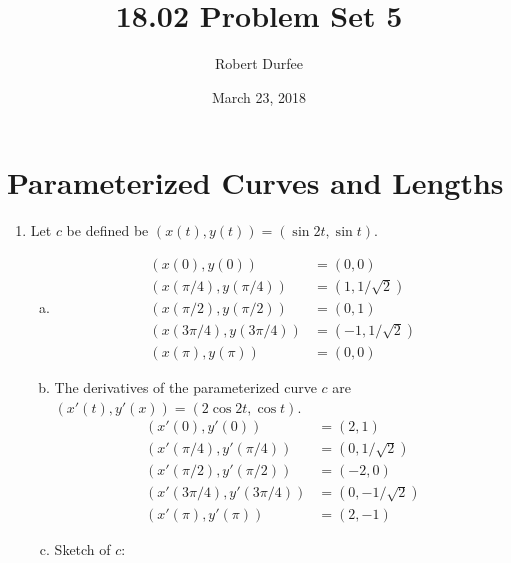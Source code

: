 \documentclass{article}
\title{ 18.02 Problem Set 5 }
\author{ Robert Durfee }
\date{ March 23, 2018 }
\begin{document}
\maketitle

\section{ Parameterized Curves and Lengths }

\begin{enumerate}[1.]
  \item Let $c$ be defined be $(x(t),y(t)) = (\sin 2t, \sin t)$.
    \begin{enumerate}[a.]
      \item \begin{align*}
          (x(0),y(0)) &= (0,0) \\
          (x(\pi / 4), y(\pi / 4)) &= (1, 1/\sqrt{2}) \\
          (x(\pi / 2), y(\pi / 2)) &= (0,1) \\
          (x(3 \pi / 4), y(3 \pi / 4)) &= (-1, 1/\sqrt{2}) \\
          (x(\pi), y(\pi)) &= (0, 0)
        \end{align*}
      \item The derivatives of the parameterized curve $c$ are $(x'(t), y'(x)) =
        (2\cos2t, \cos t)$.
        \begin{align*}
          (x'(0),y'(0)) &= (2,1) \\
          (x'(\pi / 4), y'(\pi / 4)) &= (0, 1/\sqrt{2}) \\
          (x'(\pi / 2), y'(\pi / 2)) &= (-2,0) \\
          (x'(3 \pi / 4), y'(3 \pi / 4)) &= (0, -1/\sqrt{2}) \\
          (x'(\pi), y'(\pi)) &= (2, -1)
        \end{align*}
      \item Sketch of $c$:


\end{enumerate}
\end{enumerate}
\end{document}
